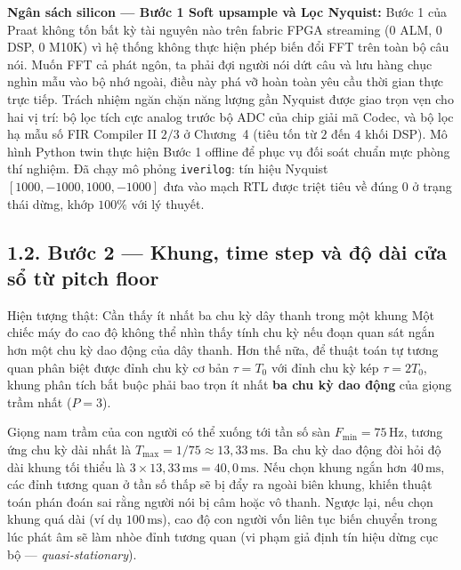 \begin{costbox}
\textbf{Ngân sách silicon --- Bước 1 Soft upsample và Lọc Nyquist:}
Bước 1 của Praat không tốn bất kỳ tài nguyên nào trên fabric FPGA streaming (0 ALM, 0 DSP, 0 M10K) vì hệ thống không thực hiện phép biến đổi FFT trên toàn bộ câu nói. Muốn FFT cả phát ngôn, ta phải đợi người nói dứt câu và lưu hàng chục nghìn mẫu vào bộ nhớ ngoài, điều này phá vỡ hoàn toàn yêu cầu thời gian thực trực tiếp. Trách nhiệm ngăn chặn năng lượng gần Nyquist được giao trọn vẹn cho hai vị trí: bộ lọc tích cực analog trước bộ ADC của chip giải mã Codec, và bộ lọc hạ mẫu số FIR Compiler II $2/3$ ở Chương~4 (tiêu tốn từ $2$ đến $4$ khối DSP). Mô hình Python twin thực hiện Bước 1 offline để phục vụ đối soát chuẩn mực phòng thí nghiệm. Đã chạy mô phỏng \texttt{iverilog}: tín hiệu Nyquist $[1000, -1000, 1000, -1000]$ đưa vào mạch RTL được triệt tiêu về đúng $0$ ở trạng thái dừng, khớp $100\%$ với lý thuyết.
\end{costbox}

\subsection*{1.2. Bước 2 --- Khung, time step và độ dài cửa sổ từ pitch floor}

\begin{firstprin}{Hiện tượng thật: Cần thấy ít nhất ba chu kỳ dây thanh trong một khung}
Một chiếc máy đo cao độ không thể nhìn thấy tính chu kỳ nếu đoạn quan sát ngắn hơn một chu kỳ dao động của dây thanh. Hơn thế nữa, để thuật toán tự tương quan phân biệt được đỉnh chu kỳ cơ bản $\tau = T_0$ với đỉnh chu kỳ kép $\tau = 2T_0$, khung phân tích bắt buộc phải bao trọn ít nhất \textbf{ba chu kỳ dao động} của giọng trầm nhất ($P = 3$).

Giọng nam trầm của con người có thể xuống tới tần số sàn $F_{\min} = 75\,\text{Hz}$, tương ứng chu kỳ dài nhất là $T_{\max} = 1 / 75 \approx 13{,}33\,\text{ms}$. Ba chu kỳ dao động đòi hỏi độ dài khung tối thiểu là $3 \times 13{,}33\,\text{ms} = 40{,}0\,\text{ms}$. Nếu chọn khung ngắn hơn $40\,\text{ms}$, các đỉnh tương quan ở tần số thấp sẽ bị đẩy ra ngoài biên khung, khiến thuật toán phán đoán sai rằng người nói bị câm hoặc vô thanh. Ngược lại, nếu chọn khung quá dài (ví dụ $100\,\text{ms}$), cao độ con người vốn liên tục biến chuyển trong lúc phát âm sẽ làm nhòe đỉnh tương quan (vi phạm giả định tín hiệu dừng cục bộ --- \emph{quasi-stationary}).
\end{firstprin}

